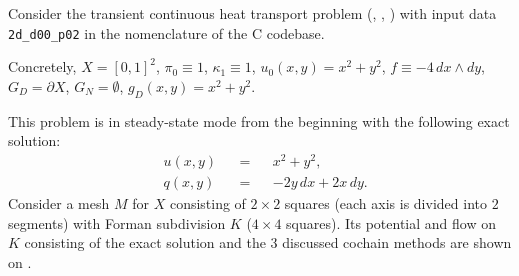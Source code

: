\begin{example}
  Consider the transient continuous heat transport problem
  (,
   ,
   )
  with input data \verb|2d_d00_p02| in the nomenclature of the C codebase.

  Concretely,
    $X = [0, 1]^2$,
    $\pi_0 \equiv 1$,
    $\kappa_1 \equiv 1$,
    $u_0(x, y) = x^2 + y^2$,
    $f \equiv - 4\, d x \wedge d y$,
    $G_D = \partial X$,
    $G_N = \emptyset$,
    $g_D(x, y) = x^2 + y^2$.

  This problem is in steady-state mode from the beginning
  with the following exact solution:
  \begin{subequations}
    \begin{alignat}{3}
      & u(x, y) && = && x^2 + y^2, \\
      & q(x, y) && = && -2 y\, d x + 2 x\, d y.
    \end{alignat}
  \end{subequations}
  Consider a mesh $M$ for $X$ consisting of $2 \times 2$ squares (each axis is
  divided into $2$ segments) with Forman subdivision $K$ ($4 \times 4$ squares).
  Its potential and flow on $K$ consisting of the exact solution and the $3$
  discussed cochain methods are shown on
  .
\end{example}
